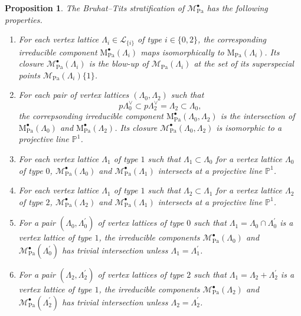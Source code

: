 \documentclass[10pt]{amsart}
\numberwithin{equation}{section}
\newtheorem{proposition}[equation]{Proposition}
\theoremstyle{definition}
\def\Pa{\mathrm{Pa}}
\def\calL{\mathcal{L}}
\def\calM{\mathcal{M}}
\def\PP{\mathbb{P}}
\def\rmM{\mathrm{M}}
\begin{document}
\begin{proposition}\label{RZ-description-bullet}
The Bruhat--Tits stratification of $\calM^{\bullet}_{\Pa}$ has the following properties.
\begin{enumerate}
\item For each vertex lattice $\Lambda_{i}\in \calL_{\{i\}}$ of type $i\in \{0,2\}$, the corresponding irreducible component $\rmM^{\bullet}_{\Pa}(\Lambda_{i})$ maps isomorphically to $\rmM_{\Pa}(\Lambda_{i})$. Its closure  $\calM^{\bullet}_{\Pa}(\Lambda_{i})$ is the blow-up of $\calM_{\Pa}(\Lambda_{i})$ at the set of its superspecial points $\calM_{\Pa}(\Lambda_{i})\{1\}$.


\item For each pair of vertex lattices $(\Lambda_{0}, \Lambda_{2})$ such that
\begin{equation*}
p\Lambda^{\vee}_{0}\subset p\Lambda^{\vee}_{2}=\Lambda_{2}\subset \Lambda_{0},
\end{equation*}
the correpsonding irreducible component $\rmM^{\bullet}_{\Pa}(\Lambda_{0}, \Lambda_{2})$ is the intersection of $\rmM^{\bullet}_{\Pa}(\Lambda_{0})$ and $\rmM^{\bullet}_{\Pa}(\Lambda_{2})$. Its closure $\calM^{\bullet}_{\Pa}(\Lambda_{0}, \Lambda_{2})$ is isomorphic to a projective line $\PP^{1}$.

\item For each vertex lattice $\Lambda_{1}$ of type $1$ such that $\Lambda_{1}\subset \Lambda_{0}$ for a vertex lattice $\Lambda_{0}$ of type $0$, $\calM^{\bullet}_{\Pa}(\Lambda_{0})$ and  $\calM^{\bullet}_{\Pa}(\Lambda_{1})$ intersects at a projective line $\PP^{1}$.

\item For each vertex lattice $\Lambda_{1}$ of type $1$ such that $\Lambda_{2}\subset \Lambda_{1}$ for a vertex lattice $\Lambda_{2}$ of type $2$, $\calM^{\bullet}_{\Pa}(\Lambda_{2})$ and $\calM^{\bullet}_{\Pa}(\Lambda_{1})$ intersects at a projective line $\PP^{1}$.

\item For a pair $(\Lambda_{0}, \Lambda^{\prime}_{0})$ of vertex lattices of type $0$ such that $\Lambda_{1}=\Lambda_{0}\cap\Lambda^{\prime}_{0}$ is a vertex lattice of type $1$, the irreducible components $\calM^{\bullet}_{\Pa}(\Lambda_{0})$ and $\calM^{\bullet}_{\Pa}(\Lambda^{\prime}_{0})$ has trivial intersection unless $\Lambda_{1}=\Lambda^{\prime}_{1}$. 

\item For a pair $(\Lambda_{2}, \Lambda^{\prime}_{2})$ of vertex lattices of type $2$ such that $\Lambda_{1}=\Lambda_{2}+\Lambda^{\prime}_{2}$ is a vertex lattice of type $1$, the irreducible components $\calM^{\bullet}_{\Pa}(\Lambda_{2})$ and $\calM^{\bullet}_{\Pa}(\Lambda^{\prime}_{2})$ has trivial intersection unless $\Lambda_{2}=\Lambda^{\prime}_{2}$.
\end{enumerate}
\end{proposition}
\end{document}
